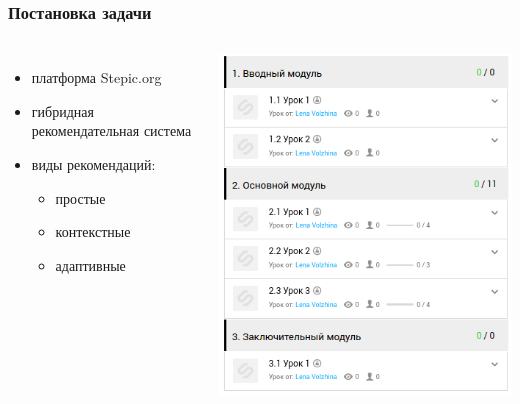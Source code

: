 \documentclass{beamer}
\begin{document}
\begin{frame}\frametitle{Постановка задачи}

\begin{columns}
        \begin{itemize}
            \item платформа Stepic.org
            \smallskip
            \item гибридная рекомендательная система
            \bigskip
            \item виды рекомендаций:
                \begin{itemize}
                    \item простые 
                    \item контекстные 
                    \item адаптивные 
                \end{itemize}
        \end{itemize}
      \centering
      \includegraphics[width=\textwidth]{images/course_structure_shrinked.png}
 \end{columns} 
    
\end{frame}
\end{document}
